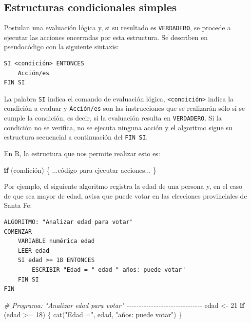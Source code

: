 \documentclass[
]{book}
\newenvironment{Shaded}{\begin{snugshade}}{\end{snugshade}}
\newcommand{\CommentTok}[1]{\textcolor[rgb]{0.56,0.35,0.01}{\textit{#1}}}
\newcommand{\ControlFlowTok}[1]{\textcolor[rgb]{0.13,0.29,0.53}{\textbf{#1}}}
\newcommand{\DecValTok}[1]{\textcolor[rgb]{0.00,0.00,0.81}{#1}}
\newcommand{\FunctionTok}[1]{\textcolor[rgb]{0.00,0.00,0.00}{#1}}
\newcommand{\NormalTok}[1]{#1}
\newcommand{\OtherTok}[1]{\textcolor[rgb]{0.56,0.35,0.01}{#1}}
\newcommand{\SpecialCharTok}[1]{\textcolor[rgb]{0.00,0.00,0.00}{#1}}
\newcommand{\StringTok}[1]{\textcolor[rgb]{0.31,0.60,0.02}{#1}}
\begin{document}
\hypertarget{estructuras-condicionales-simples}{%
\subsection{Estructuras condicionales simples}\label{estructuras-condicionales-simples}}

Postulan una evaluación lógica y, si su resultado es \texttt{VERDADERO}, se procede a ejecutar las acciones encerradas por esta estructura. Se describen en pseudocódigo con la siguiente sintaxis:

\begin{verbatim}
SI <condición> ENTONCES
    Acción/es
FIN SI
\end{verbatim}

La palabra \texttt{SI} indica el comando de evaluación lógica, \texttt{\textless{}condición\textgreater{}} indica la condición a evaluar y \texttt{Acción/es} son las instrucciones que se realizarán sólo si se cumple la condición, es decir, si la evaluación resulta en \texttt{VERDADERO}. Si la condición no se verifica, no se ejecuta ninguna acción y el algoritmo sigue su estructura secuencial a continuación del \texttt{FIN\ SI}.

En R, la estructura que nos permite realizar esto es:

\begin{Shaded}
\begin{Highlighting}[]
\ControlFlowTok{if}\NormalTok{ (condición) \{}
\NormalTok{    ...código para ejecutar acciones...}
\NormalTok{\}}
\end{Highlighting}
\end{Shaded}

Por ejemplo, el siguiente algoritmo registra la edad de una persona y, en el caso de que sea mayor de edad, avisa que puede votar en las elecciones provinciales de Santa Fe:

\begin{verbatim}
ALGORITMO: "Analizar edad para votar"
COMENZAR
    VARIABLE numérica edad
    LEER edad
    SI edad >= 18 ENTONCES
        ESCRIBIR "Edad = " edad " años: puede votar"
    FIN SI
FIN
\end{verbatim}

\begin{Shaded}
\begin{Highlighting}[]
\CommentTok{\# Programa: "Analizar edad para votar" {-}{-}{-}{-}{-}{-}{-}{-}{-}{-}{-}{-}{-}{-}{-}{-}{-}{-}{-}{-}{-}{-}{-}{-}{-}{-}{-}{-}{-}{-}{-}}
\NormalTok{edad }\OtherTok{\textless{}{-}} \DecValTok{21}
\ControlFlowTok{if}\NormalTok{ (edad }\SpecialCharTok{\textgreater{}=} \DecValTok{18}\NormalTok{) \{}
    \FunctionTok{cat}\NormalTok{(}\StringTok{"Edad ="}\NormalTok{, edad, }\StringTok{"años: puede votar"}\NormalTok{)}
\NormalTok{\}}
\end{Highlighting}
\end{Shaded}
\end{document}
